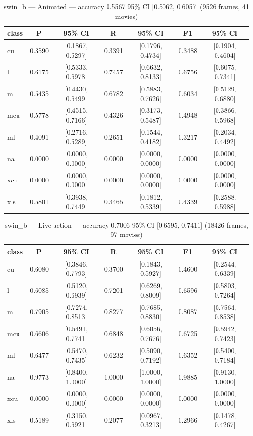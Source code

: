 \begin{table}[htbp]
\centering
\caption{swin\_b — Animated — accuracy 0.5567 95\% CI [0.5062, 0.6057] (9526 frames, 41 movies)}
\label{tab:swin-b-animated}
\begin{tabular}{lcccccc}
\toprule
class & P & 95\% CI & R & 95\% CI & F1 & 95\% CI \\
\midrule
cu & 0.3590 & [0.1867, 0.5297] & 0.3391 & [0.1796, 0.4734] & 0.3488 & [0.1904, 0.4604] \\
l & 0.6175 & [0.5333, 0.6978] & 0.7457 & [0.6632, 0.8133] & 0.6756 & [0.6075, 0.7341] \\
m & 0.5435 & [0.4430, 0.6499] & 0.6782 & [0.5883, 0.7626] & 0.6034 & [0.5129, 0.6880] \\
mcu & 0.5778 & [0.4515, 0.7166] & 0.4326 & [0.3173, 0.5487] & 0.4948 & [0.3866, 0.5968] \\
ml & 0.4091 & [0.2716, 0.5289] & 0.2651 & [0.1544, 0.4182] & 0.3217 & [0.2034, 0.4492] \\
na & 0.0000 & [0.0000, 0.0000] & 0.0000 & [0.0000, 0.0000] & 0.0000 & [0.0000, 0.0000] \\
xcu & 0.0000 & [0.0000, 0.0000] & 0.0000 & [0.0000, 0.0000] & 0.0000 & [0.0000, 0.0000] \\
xls & 0.5801 & [0.3938, 0.7449] & 0.3465 & [0.1812, 0.5339] & 0.4339 & [0.2588, 0.5988] \\
\bottomrule
\end{tabular}
\end{table}

\begin{table}[htbp]
\centering
\caption{swin\_b — Live-action — accuracy 0.7006 95\% CI [0.6595, 0.7411] (18426 frames, 97 movies)}
\label{tab:swin-b-live-action}
\begin{tabular}{lcccccc}
\toprule
class & P & 95\% CI & R & 95\% CI & F1 & 95\% CI \\
\midrule
cu & 0.6080 & [0.3846, 0.7793] & 0.3700 & [0.1843, 0.5927] & 0.4600 & [0.2544, 0.6339] \\
l & 0.6085 & [0.5120, 0.6939] & 0.7201 & [0.6269, 0.8009] & 0.6596 & [0.5803, 0.7264] \\
m & 0.7905 & [0.7274, 0.8513] & 0.8277 & [0.7685, 0.8830] & 0.8087 & [0.7564, 0.8538] \\
mcu & 0.6606 & [0.5491, 0.7741] & 0.6848 & [0.6056, 0.7676] & 0.6725 & [0.5942, 0.7423] \\
ml & 0.6477 & [0.5470, 0.7435] & 0.6232 & [0.5090, 0.7192] & 0.6352 & [0.5400, 0.7184] \\
na & 0.9773 & [0.8400, 1.0000] & 1.0000 & [1.0000, 1.0000] & 0.9885 & [0.9130, 1.0000] \\
xcu & 0.0000 & [0.0000, 0.0000] & 0.0000 & [0.0000, 0.0000] & 0.0000 & [0.0000, 0.0000] \\
xls & 0.5189 & [0.3150, 0.6921] & 0.2077 & [0.0967, 0.3213] & 0.2966 & [0.1478, 0.4267] \\
\bottomrule
\end{tabular}
\end{table}

